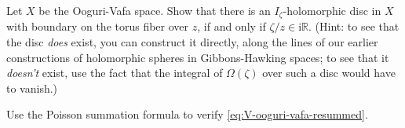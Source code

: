\documentclass[12pt,letterpaper,reqno]{article}
\numberwithin{equation}{section}
\newcommand{\R}{\ensuremath{\mathbb R}}
\newcommand{\I}{{\mathrm i}}
\newcommand{\ti}[1]{\textit{#1}}
\newcommand{\fixme}[1]{{\color{orange}{[#1]}}}
\begin{document}
\begin{exercise} \label{exc:ooguri-vafa-holomorphic-discs} \cite{ovmh} Let $X$ be the Ooguri-Vafa space.
Show that there is an $I_\zeta$-holomorphic disc in $X$
with boundary on the torus fiber over $z$, if and 
only if $\zeta / z \in \I \R$. 
(Hint: to see that the disc \ti{does}
exist, you can construct it directly, along the lines of our 
earlier constructions of holomorphic spheres in Gibbons-Hawking spaces; 
to see that it \ti{doesn't} exist,
use the fact that the integral of $\Omega(\zeta)$ over such 
a disc would have to vanish.)
\end{exercise}

\begin{exercise} Use the Poisson summation formula to verify
\eqref{eq:V-ooguri-vafa-resummed}. \fixme{warning, this is hard}
\end{exercise}
\end{document}
